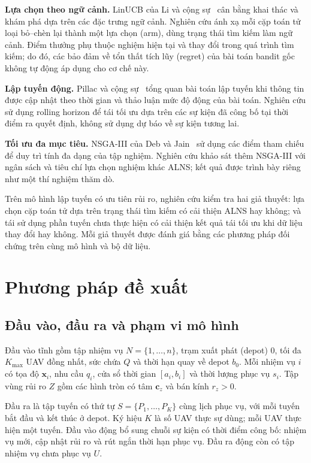 \documentclass[11pt,a4paper]{article}
\begin{document}
\textbf{Lựa chọn theo ngữ cảnh.} LinUCB của Li và cộng sự~\cite{linucb} cân bằng khai thác và khám phá dựa trên các đặc trưng ngữ cảnh. Nghiên cứu ánh xạ mỗi cặp toán tử loại bỏ--chèn lại thành một lựa chọn (arm), dùng trạng thái tìm kiếm làm ngữ cảnh. Điểm thưởng phụ thuộc nghiệm hiện tại và thay đổi trong quá trình tìm kiếm; do đó, các bảo đảm về tổn thất tích lũy (regret) của bài toán bandit gốc không tự động áp dụng cho cơ chế này.

\textbf{Lập tuyến động.} Pillac và cộng sự~\cite{dynamic} tổng quan bài toán lập tuyến khi thông tin được cập nhật theo thời gian và thảo luận mức độ động của bài toán. Nghiên cứu sử dụng rolling horizon để tái tối ưu dựa trên các sự kiện đã công bố tại thời điểm ra quyết định, không sử dụng dự báo về sự kiện tương lai.

\textbf{Tối ưu đa mục tiêu.} NSGA-III của Deb và Jain~\cite{nsga} sử dụng các điểm tham chiếu để duy trì tính đa dạng của tập nghiệm. Nghiên cứu khảo sát thêm NSGA-III với ngân sách và tiêu chí lựa chọn nghiệm khác ALNS; kết quả được trình bày riêng như một thí nghiệm thăm dò.

Trên mô hình lập tuyến có ưu tiên rủi ro, nghiên cứu kiểm tra hai giả thuyết: lựa chọn cặp toán tử dựa trên trạng thái tìm kiếm có cải thiện ALNS hay không; và tái sử dụng phần tuyến chưa thực hiện có cải thiện kết quả tái tối ưu khi dữ liệu thay đổi hay không. Mỗi giả thuyết được đánh giá bằng các phương pháp đối chứng trên cùng mô hình và bộ dữ liệu.

\section{Phương pháp đề xuất}
\subsection{Đầu vào, đầu ra và phạm vi mô hình}
Đầu vào tĩnh gồm tập nhiệm vụ $N=\{1,\ldots,n\}$, trạm xuất phát (depot) $0$, tối đa $K_{\max}$ UAV đồng nhất, sức chứa $Q$ và thời hạn quay về depot $b_0$. Mỗi nhiệm vụ $i$ có tọa độ $\mathbf{x}_i$, nhu cầu $q_i$, cửa sổ thời gian $[a_i,b_i]$ và thời lượng phục vụ $s_i$. Tập vùng rủi ro $Z$ gồm các hình tròn có tâm $\mathbf{c}_z$ và bán kính $r_z>0$.

Đầu ra là tập tuyến có thứ tự $S=\{P_1,\ldots,P_K\}$ cùng lịch phục vụ, với mỗi tuyến bắt đầu và kết thúc ở depot. Ký hiệu $K$ là số UAV thực sự dùng; mỗi UAV thực hiện một tuyến. Đầu vào động bổ sung chuỗi sự kiện có thời điểm công bố: nhiệm vụ mới, cập nhật rủi ro và rút ngắn thời hạn phục vụ. Đầu ra động còn có tập nhiệm vụ chưa phục vụ $U$.
\end{document}
